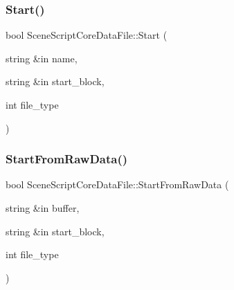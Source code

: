 \hypertarget{class_scene_script_core_data_file_a13d8ea5ef149ed86699119782a474652}{}\label{class_scene_script_core_data_file_a13d8ea5ef149ed86699119782a474652} 
\subsubsection{\texorpdfstring{Start()}{Start()}\hspace{0.1cm}{\footnotesize\ttfamily [2/2]}}
{\footnotesize\ttfamily bool Scene\+Script\+Core\+Data\+File\+::\+Start (\begin{DoxyParamCaption}\item[{string \&in}]{name,  }\item[{string \&in}]{start\+\_\+block,  }\item[{int}]{file\+\_\+type }\end{DoxyParamCaption})}

\hypertarget{class_scene_script_core_data_file_a224d64e4494fb6ad200c6b7cb04586b5}{}\label{class_scene_script_core_data_file_a224d64e4494fb6ad200c6b7cb04586b5} 
\subsubsection{\texorpdfstring{Start\+From\+Raw\+Data()}{StartFromRawData()}}
{\footnotesize\ttfamily bool Scene\+Script\+Core\+Data\+File\+::\+Start\+From\+Raw\+Data (\begin{DoxyParamCaption}\item[{string \&in}]{buffer,  }\item[{string \&in}]{start\+\_\+block,  }\item[{int}]{file\+\_\+type }\end{DoxyParamCaption})}

